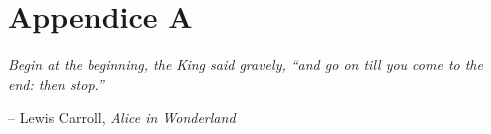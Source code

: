 

\chapter{Appendice A}
\epigraph{\itshape Begin at the beginning, the King said gravely, ``and go on till you come to the end: then stop.''}{-- Lewis Carroll, \textit{Alice in Wonderland}}





